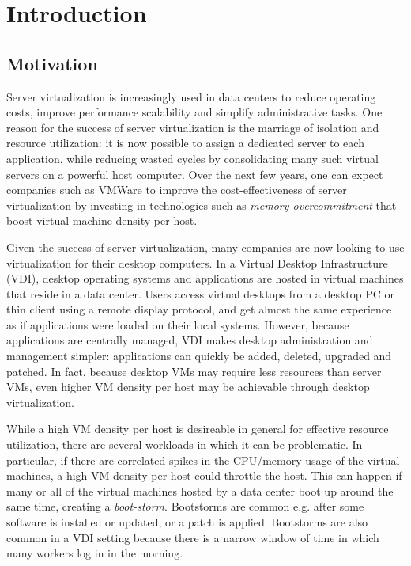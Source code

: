 \chapter{Introduction}
\section{Motivation}
Server virtualization is increasingly used in data centers to 
reduce operating costs, improve performance scalability and 
simplify administrative tasks. One reason for the success of
server virtualization is the marriage of isolation and resource 
utilization: it is now possible to assign a dedicated server 
to each application, while reducing wasted cycles by consolidating 
many such virtual servers on a powerful host computer. Over
the next few years, one can expect companies such as VMWare 
to improve the cost-effectiveness of server virtualization by
investing in technologies such as \emph{memory overcommitment} 
that boost virtual machine density per host.

Given the success of server virtualization, many companies are now  
looking to use virtualization for their desktop computers.
In a Virtual Desktop Infrastructure (VDI), desktop operating systems 
and applications are hosted in virtual machines that reside in a data 
center. Users access virtual desktops from a desktop PC or
thin client using a remote display protocol, and get almost the
same experience as if applications were loaded on their local systems.
However, because applications are centrally managed, 
VDI makes desktop administration and management simpler: applications
can quickly be added, deleted, upgraded and patched. 
In fact, because desktop VMs may require less resources than 
server VMs, even higher VM density per host may be achievable
through desktop virtualization.

While a high VM density per host is desireable in general for
effective resource utilization, there are several workloads in which
it can be problematic. In particular, if there are correlated spikes
in the CPU/memory usage of the virtual machines, a high VM density
per host could throttle the host. This can happen if many or all
of the virtual machines hosted by a data center boot up around
the same time, creating a \emph{boot-storm}. Bootstorms
are common e.g. after some software is installed or updated,
or a patch is applied. Bootstorms are also common
in a VDI setting because there is a narrow window of time
in which many workers log in in the morning.

